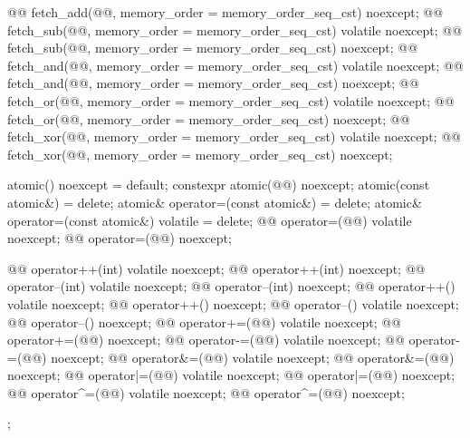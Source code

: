 \begin{codeblock}
{    @@ fetch_add(@@, memory_order = memory_order_seq_cst) noexcept;
    @@ fetch_sub(@@, memory_order = memory_order_seq_cst) volatile noexcept;
    @@ fetch_sub(@@, memory_order = memory_order_seq_cst) noexcept;
    @@ fetch_and(@@, memory_order = memory_order_seq_cst) volatile noexcept;
    @@ fetch_and(@@, memory_order = memory_order_seq_cst) noexcept;
    @@ fetch_or(@@, memory_order = memory_order_seq_cst) volatile noexcept;
    @@ fetch_or(@@, memory_order = memory_order_seq_cst) noexcept;
    @@ fetch_xor(@@, memory_order = memory_order_seq_cst) volatile noexcept;
    @@ fetch_xor(@@, memory_order = memory_order_seq_cst) noexcept;

    atomic() noexcept = default;
    constexpr atomic(@@) noexcept;
    atomic(const atomic&) = delete;
    atomic& operator=(const atomic&) = delete;
    atomic& operator=(const atomic&) volatile = delete;
    @@ operator=(@@) volatile noexcept;
    @@ operator=(@@) noexcept;

    @@ operator++(int) volatile noexcept;
    @@ operator++(int) noexcept;
    @@ operator--(int) volatile noexcept;
    @@ operator--(int) noexcept;
    @@ operator++() volatile noexcept;
    @@ operator++() noexcept;
    @@ operator--() volatile noexcept;
    @@ operator--() noexcept;
    @@ operator+=(@@) volatile noexcept;
    @@ operator+=(@@) noexcept;
    @@ operator-=(@@) volatile noexcept;
    @@ operator-=(@@) noexcept;
    @@ operator&=(@@) volatile noexcept;
    @@ operator&=(@@) noexcept;
    @@ operator|=(@@) volatile noexcept;
    @@ operator|=(@@) noexcept;
    @@ operator^=(@@) volatile noexcept;
    @@ operator^=(@@) noexcept;
  };
\end{codeblock}

